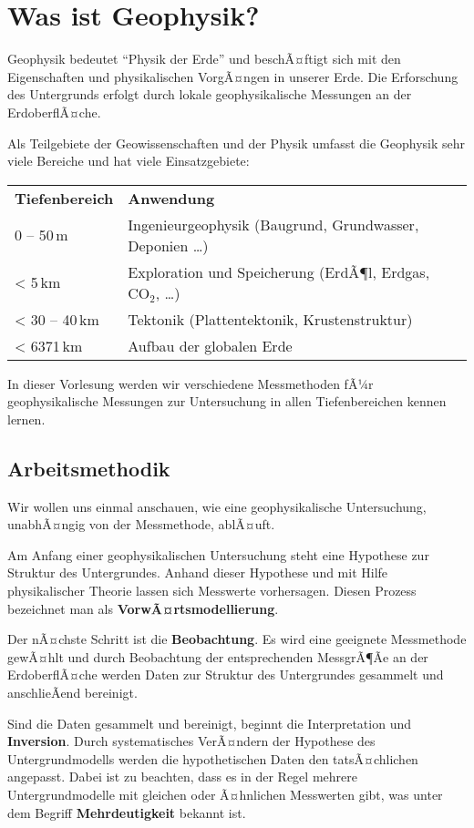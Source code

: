 \chapter{Was ist Geophysik?}

Geophysik bedeutet "`Physik der Erde"' und beschÃ¤ftigt sich mit den Eigenschaften und physikalischen VorgÃ¤ngen in unserer Erde. Die Erforschung des Untergrunds erfolgt durch lokale geophysikalische Messungen an der ErdoberflÃ¤che. 

 Als Teilgebiete der Geowissenschaften und der Physik umfasst die Geophysik sehr viele Bereiche und hat viele Einsatzgebiete:
 
\vspace{0.7cm}
 
\begin{tabular}{ll}
  \textbf{Tiefenbereich} & \textbf{Anwendung}\\
  0 -- 50\,m & Ingenieurgeophysik (Baugrund, Grundwasser, Deponien \dots )\\
  < 5\,km & Exploration und Speicherung (ErdÃ¶l, Erdgas, $\text{CO}_2$, \dots )\\
  < 30 -- 40\,km & Tektonik (Plattentektonik, Krustenstruktur)\\
  < 6371\,km & Aufbau der globalen Erde
\end{tabular} 

In dieser Vorlesung werden wir verschiedene Messmethoden fÃ¼r geophysikalische Messungen zur Untersuchung in allen Tiefenbereichen kennen lernen.
 
\section{Arbeitsmethodik}
Wir wollen uns einmal anschauen, wie eine geophysikalische Untersuchung, unabhÃ¤ngig von der Messmethode, ablÃ¤uft. \par

Am Anfang einer geophysikalischen Untersuchung steht eine Hypothese zur Struktur des Untergrundes. Anhand dieser Hypothese und mit Hilfe physikalischer Theorie lassen sich Messwerte vorhersagen. Diesen Prozess bezeichnet man als \textbf{VorwÃ¤rtsmodellierung}.

Der nÃ¤chste Schritt ist die \textbf{Beobachtung}. Es wird eine geeignete Messmethode gewÃ¤hlt und durch Beobachtung der entsprechenden MessgrÃ¶Ãe an der ErdoberflÃ¤che werden Daten zur Struktur des Untergrundes gesammelt und anschlieÃend bereinigt. 

Sind die Daten gesammelt und bereinigt, beginnt die Interpretation und \textbf{Inversion}. Durch systematisches VerÃ¤ndern der Hypothese des Untergrundmodells werden die hypothetischen Daten den tatsÃ¤chlichen angepasst. Dabei ist zu beachten, dass es in der Regel mehrere Untergrundmodelle mit gleichen oder Ã¤hnlichen Messwerten gibt, was unter dem Begriff \textbf{Mehrdeutigkeit} bekannt ist. 

